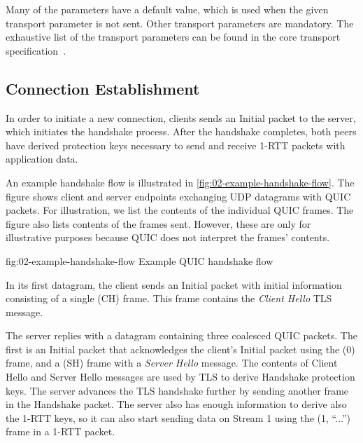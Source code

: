 Many of the parameters have a default value, which is used when the given transport parameter is not
sent. Other transport parameters are mandatory. The exhaustive list of the transport parameters can be found in the core transport specification~\cite[Section~7.4]{draft-ietf-quic-transport}.

\subsection{Connection Establishment}

In order to initiate a new connection, clients sends an Initial packet to the server, which
initiates the handshake process. After the handshake completes, both peers have derived protection
keys necessary to send and receive 1-RTT packets with application data.

An example handshake flow is illustrated in \autoref{fig:02-example-handshake-flow}. The figure
shows client and server endpoints exchanging UDP datagrams with QUIC packets. For illustration, we
list the contents of the individual QUIC frames. The figure also lists contents of the \CRYPTO{}
frames sent. However, these are only for illustrative purposes because QUIC does not interpret the
\CRYPTO{} frames' contents.

\begin{myFigure} {fig:02-example-handshake-flow} {Example QUIC handshake flow}

\resizebox{\linewidth}{!}{}

\end{myFigure}

In its first datagram, the client sends an Initial packet with initial information consisting of a
single \CRYPTO{}(CH) frame. This frame contains the \textit{Client Hello} TLS message.

The server replies with a datagram containing three coalesced QUIC packets. The first is an Initial
packet that acknowledges the client's Initial packet using the \ACK{}(0) frame, and a \CRYPTO{}(SH)
frame with a \textit{Server Hello} message. The contents of Client Hello and Server Hello messages
are used by TLS to derive Handshake protection keys. The server advances the TLS handshake further
by sending another \CRYPTO{} frame in the Handshake packet. The server also has enough information
to derive also the 1-RTT keys, so it can also start sending data on Stream 1 using the \STREAM{}(1,
``...'') frame in a 1-RTT packet.

